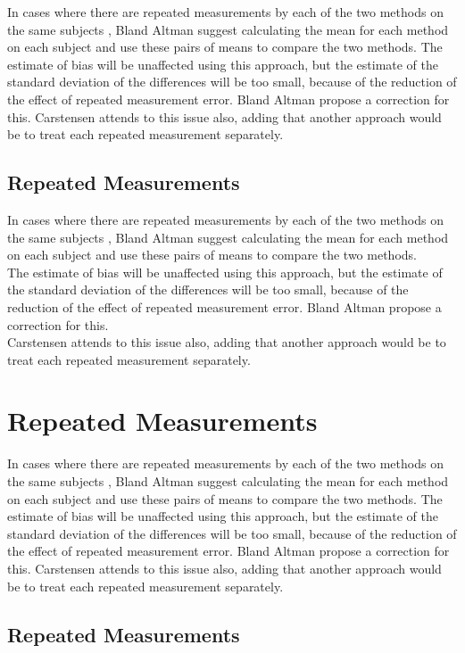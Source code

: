 In cases where there are repeated measurements by each of the two
methods on the same subjects , Bland Altman suggest calculating
the mean for each method on each subject and use these pairs of
means to compare the two methods.
The estimate of bias will be unaffected using this approach, but
the estimate of the standard deviation of the differences will be
too small, because of the reduction of the effect of repeated
measurement error. Bland Altman propose a correction for this.
Carstensen attends to this issue also, adding that another
approach would be to treat each repeated measurement separately.

\subsection{Repeated Measurements }
In cases where there are repeated measurements by each of the two methods on the same subjects , Bland Altman suggest calculating
the mean for each method on each subject and use these pairs of means to compare the two methods.
\\
The estimate of bias will be unaffected using this approach, but the estimate of the standard deviation of the differences will be
too small, because of the reduction of the effect of repeated measurement error. Bland Altman propose a correction for this.
\\
Carstensen attends to this issue also, adding that another approach would be to treat each repeated measurement separately.

\newpage
\section{Repeated Measurements}

In cases where there are repeated measurements by each of the two methods on the same subjects , Bland Altman suggest calculating
the mean for each method on each subject and use these pairs of means to compare the two methods.
The estimate of bias will be unaffected using this approach, but the estimate of the standard deviation of the differences will be
too small, because of the reduction of the effect of repeated measurement error. Bland Altman propose a correction for this.
Carstensen attends to this issue also, adding that another approach would be to treat each repeated measurement separately.
\subsection{Repeated Measurements }

